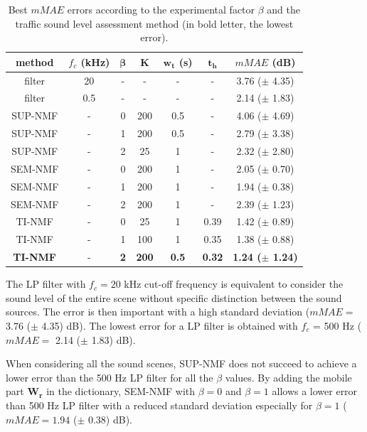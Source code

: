 \documentclass[review,5p,twocolumn,sort&compress,times]{elsarticle}
\begin{document}
\begin{table}[t]
\centering
\caption{Best $mMAE$ errors according to the experimental factor $\beta$ and the traffic sound level assessment method (in bold letter, the lowest error).}
\begin{tabular}{@{}ccccccc@{}}
\toprule
\textbf{method} & $f_c$ (kHz) & $\mathbf{\beta}$ & $\mathbf{K}$ & $\mathbf{w_t}$ (s) &  $\mathbf{t_h}$ &  \textbf{$mMAE$} (dB) \\ \midrule
filter & 20 & - & - & - & - & 3.76 ($\pm$ 4.35) \\
filter & 0.5 & - & - & - & - & 2.14 ($\pm$ 1.83) \\
\hline \hline
SUP-NMF & - & 0 & 200 & 0.5 & - & 4.06 ($\pm$ 4.69) \\
SUP-NMF & - & 1 & 200 & 0.5 & - & 2.79 ($\pm$ 3.38) \\
SUP-NMF & - & 2 & 25 & 1 & - & 2.32  ($\pm$ 2.80) \\
\hline \hline
SEM-NMF & - & 0 & 200 & 1 & - & 2.05 ($\pm$ 0.70) \\
SEM-NMF & - & 1 & 200 & 1 & - & 1.94 ($\pm$ 0.38) \\
SEM-NMF & - & 2 & 200 & 1 & - & 2.39 ($\pm$ 1.23) \\
\hline \hline
TI-NMF & - & 0 & 25 & 1 & 0.39 & 1.42 ($\pm$ 0.89)\\
TI-NMF & - & 1 & 100 & 1 & 0.35 & 1.38 ($\pm$ 0.88)\\
\textbf{TI-NMF }& - & \textbf{2} & \textbf{200} & \textbf{0.5} & \textbf{0.32} & \textbf{1.24 ($\pm$ 1.24)}\\
\bottomrule
\end{tabular}
\label{tab:results}
\end{table}

The LP filter with $f_c = 20$ kHz cut-off frequency is equivalent to consider the sound level of the entire scene without specific distinction between the sound sources. The error is then important with a high standard deviation ($mMAE =$ 3.76 ($\pm$ 4.35) dB). The lowest error for a LP filter is obtained with $f_c$ = 500 Hz ($mMAE =$ 2.14 ($\pm$ 1.83) dB).

When considering all the sound scenes, SUP-NMF does not succeed to achieve a lower error than the 500 Hz LP filter for all the $\beta$ values. By adding the mobile part $\mathbf{W_r}$ in the dictionary, SEM-NMF with $\beta = 0$ and $\beta = 1$ allows a lower error than 500 Hz LP filter with a reduced standard deviation especially for $\beta = 1$ ($mMAE = 1.94$ ($\pm$ 0.38) dB).
\end{document}
